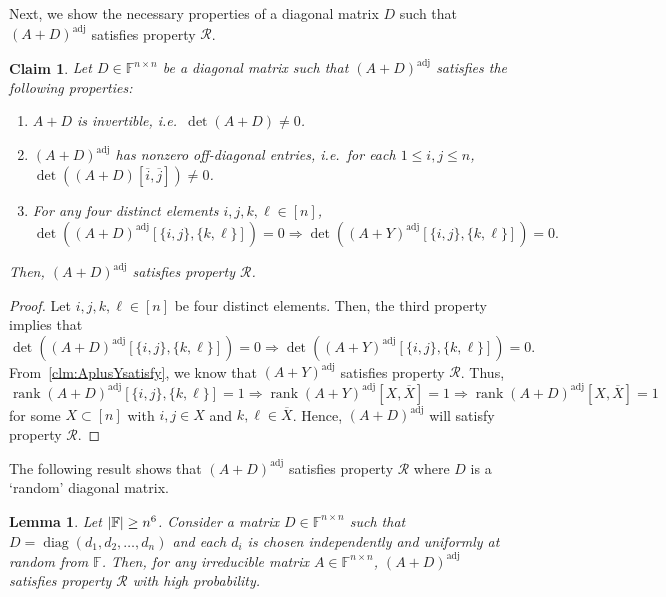 \documentclass[11pt,letterpaper]{article}
\DeclarePairedDelimiter{\card}{|}{|}
\DeclareMathOperator*{\diag}{diag}
\DeclareMathOperator*{\rank}{rank}
\newcommand{\comp}[1]{\overline{#1}}
\newcommand{\F}{\mathbb{F}}
\newtheorem{lemma}{Lemma}[section]
\newtheorem{claim}{Claim}[section]
\DeclareMathOperator{\ad}{adj}
\newcommand{\adj}[1]{(#1)^{\ad}}
\newcommand{\prop}{\mathcal{R}}
\begin{document}
{{{Next, we show the necessary properties of a diagonal matrix $D$ such that $\adj{A+D}$ satisfies property $\prop$.
\begin{claim}
\label{clm:satisfying-prop-Q}
Let $D\in \mathbb{F}^{n\times n}$ be a diagonal matrix such that $\adj{A+D}$ %
satisfies the following properties:
\begin{enumerate}
\item $A+D$ is invertible, i.e.\ $\det(A + D) \neq 0$.
\item $\adj{A+D}$  has nonzero off-diagonal entries, i.e.\ for each $1\leq i,j \leq n$, $\det ((A + D)[\comp{i}, \comp{j}]) \neq 0$.
\item For any four distinct elements $i,j,k,\ell\in[n]$,  
\begin{equation}\label{eq:diag-shift-property}
  \det\left(\adj{A+D}[\{i,j\}, \{k,\ell\}]\right)=0 \Longrightarrow \det\left(\adj{A+Y}[\{i,j\},\{k,\ell\}]\right)=0.   
\end{equation}
\end{enumerate}
Then, $\adj{A+D}$ satisfies property $\prop$.
\end{claim}
\begin{proof}
Let $i,j,k,\ell\in[n]$ be four distinct elements. Then, the third property implies that $$\det\left(\adj{A+D}[\{i,j\}, \{k,\ell\}]\right)=0\Longrightarrow \det\left(\adj{A+Y}[\{i,j\}, \{k,\ell\}]\right)=0.$$ From~\cref{clm:AplusYsatisfy}, we know that $\adj{A+Y}$ satisfies property $\prop$. Thus, $$\rank \adj{A+D}[\{i,j\},\{k,\ell\}]=1\Longrightarrow \rank \adj{A+Y}[X,\comp{X}]=1 \Longrightarrow \rank \adj{A+D}[X,\comp{X}]=1$$ for some $X\subset [n]$ with $i,j\in X$ and $k,\ell\in \comp{X}$. 
Hence, $\adj{A+D}$ will satisfy property $\prop.$
\end{proof}

The following result shows that $\adj{A+D}$ satisfies property $\prop$ where $D$ is a `random' diagonal matrix.

\begin{lemma}\label{lemma:random-diag-shift-satisfies-R}
    Let $\card{\F} \geq n^6$. Consider a matrix $D\in \F^{n\times n}$ such that $D = \diag(d_1, d_2, \ldots, d_n)$ and each $d_i$ is chosen independently and uniformly at random from $\F$. Then, for any irreducible matrix $A\in \F^{n\times n}$, $\adj{A+D}$ satisfies property $\prop$ with high probability.
\end{lemma}

}}}
\end{document}
